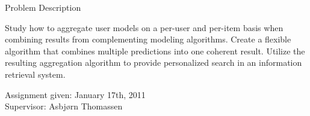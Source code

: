 \null\vspace{11em}
{
  \centering
  \normalfont
  \huge
  Problem Description\\
}
\vspace{2em}

\noindent
Study how to aggregate user models on a per-user and per-item
basis when combining results from complementing modeling algorithms.
Create a flexible algorithm that combines multiple predictions
into one coherent result.
Utilize the resulting aggregation algorithm
to provide personalized search in an information retrieval system.

\vspace{1em}
\begin{flushleft}


  Assignment given: January 17th, 2011\\
  Supervisor: Asbjørn Thomassen\\


\end{flushleft}

\cleardoublepage
